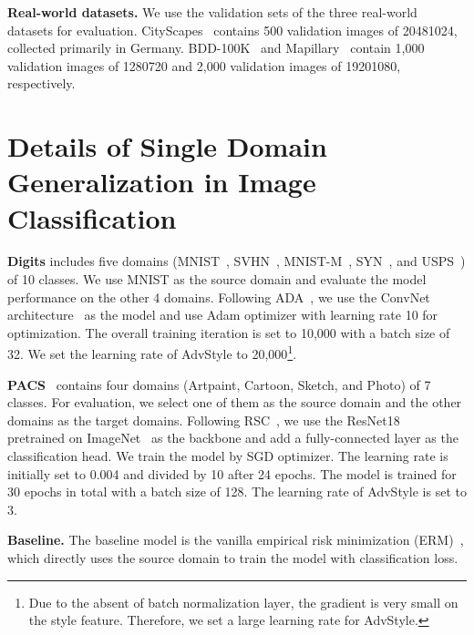 \documentclass{article}
\newcommand{\ours}{AdvStyle\xspace}
\begin{document}
\textbf{Real-world datasets.}
We use the validation sets of the three real-world datasets for evaluation. CityScapes~\cite{CityScapes} contains 500 validation images of 20481024, collected primarily in Germany. BDD-100K~\cite{bdd} and Mapillary~\cite{mapillary} contain 1,000 validation images of 1280720  and 2,000  validation images of 19201080, respectively.

\section{Details of Single Domain Generalization in Image Classification}
\label{sec:details-of-single}

\textbf{Digits} includes five domains (MNIST~\cite{mnist}, SVHN~\cite{svhn}, MNIST-M~\cite{mnist-m-syn}, SYN~\cite{mnist-m-syn}, and USPS~\cite{USPS}) of 10 classes. We use MNIST as the source domain and evaluate the model performance on the other 4 domains. Following ADA~\cite{volpi2018generalizing}, we use the ConvNet architecture~\cite{mnist} as the model and use Adam optimizer with learning rate 10 for optimization. The overall training iteration is set to 10,000 with a batch size of 32. We set the learning rate of \ours to 20,000\footnote{Due to the absent of batch normalization layer, the gradient is very small on the style feature. Therefore, we set a large learning rate for \ours.}. 

\textbf{PACS}~\cite{pacs} contains four domains (Artpaint, Cartoon, Sketch, and Photo) of 7 classes. For evaluation, we select one of them as the source domain and the other domains as the target domains. Following RSC~\cite{huangRSC2020}, we use the ResNet18~\cite{he2016deep} pretrained on ImageNet~\cite{imagenet} as the backbone and add a fully-connected layer as the classification head. We train the model by SGD optimizer. The learning rate is initially set to 0.004 and divided by 10 after 24 epochs. The model is trained for 30 epochs in total with a batch size of 128. The learning rate of \ours is set to 3.

\textbf{Baseline.} The baseline model is the vanilla empirical risk minimization (ERM)~\cite{vapnik2013nature}, which directly uses the source domain to train the model with classification loss.
\end{document}
